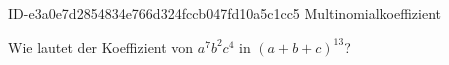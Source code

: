 \begin{exercise}
      {ID-e3a0e7d2854834e766d324fccb047fd10a5c1cc5}
      {Multinomialkoeffizient}
  \ifproblem\problem\par
    Wie lautet der Koeffizient von $a^{7}b^{2}c^{4}$ in $(a+b+c)^{13}$?
  \fi
\end{exercise}
